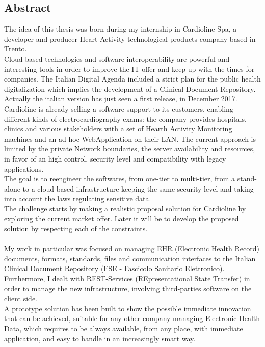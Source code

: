 \thispagestyle{empty}
\begin{center}
    {\chapter*{Abstract}} %
\end{center}
\label{abstract}

The idea of this thesis was born during my internship in Cardioline Spa, a developer and producer Heart Activity technological products company based in Trento.\\Cloud-based technologies and software interoperability are powerful and interesting tools in order to improve the IT offer and keep up with the times for companies. The Italian Digital Agenda included a strict plan for the public health digitalization which implies the development of a Clinical Document Repository. Actually the italian version has just seen a first release, in December 2017.\\Cardioline is already selling a software support to its customers, enabling different kinds of electrocardiography exams: the company provides hospitals, clinics and various stakeholders with a set of Hearth Activity Monitoring machines and an ad hoc WebApplication on their LAN. The current approach is limited by the private Network boundaries, the server availability and resources, in favor of an high control, security level and compatibility with legacy applications.\\The goal is to reengineer the softwares, from one-tier to multi-tier, from a stand-alone to a cloud-based infrastructure keeping the same security level and taking into account the laws regulating sensitive data.\\ The challenge starts by making a realistic proposal solution for Cardioline by exploring the current market offer. Later it will be to develop the proposed solution by respecting each of the constraints.\\ \\My work in particular was focused on managing EHR (Electronic Health Record) documents, formats, standards, files and communication interfaces to the Italian Clinical Document Repository (FSE - Fascicolo Sanitario Elettronico).\\Furthermore, I dealt with REST-Services (REpresentational State Transfer) in order to manage the new infrastructure, involving third-parties software on the client side.\\A prototype solution has been built to show the possible immediate innovation that can be achieved, suitable for any other company managing Electronic Health Data, which requires to be always available, from any place, with immediate application, and easy to handle in an increasingly smart way.\\ \\
